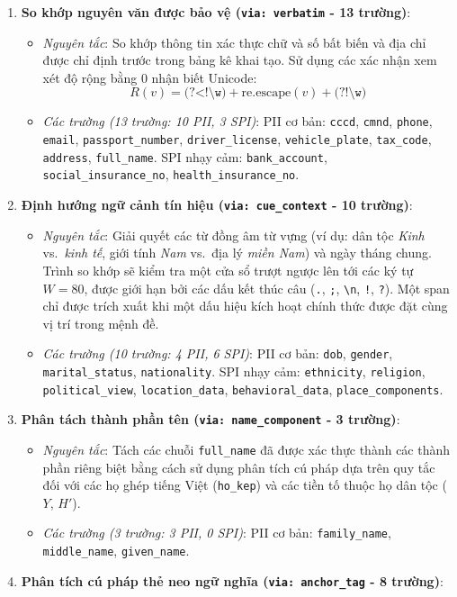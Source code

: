 \documentclass[
  11pt,
  a4paper,
]{article}
\providecommand{\tightlist}{%
  \setlength{\itemsep}{0pt}\setlength{\parskip}{0pt}}
\begin{document}
\begin{enumerate}
\def\labelenumi{\arabic{enumi}.}
\tightlist
\item
  \textbf{So khớp nguyên văn được bảo vệ (\texttt{via:\ verbatim} - 13
  trường)}:

  \begin{itemize}
  \tightlist
  \item
    \emph{Nguyên tắc}: So khớp thông tin xác thực chữ và số bất biến và
    địa chỉ được chỉ định trước trong bảng kê khai tạo. Sử dụng các xác
    nhận xem xét độ rộng bằng 0 nhận biết Unicode:
    \[R(v) = \texttt{(?<!\textbackslash{}w)} + \text{re.escape}(v) + \texttt{(?!\textbackslash{}w)}\]
  \item
    \emph{Các trường (13 trường: 10 PII, 3 SPI)}: PII cơ bản:
    \texttt{cccd}, \texttt{cmnd}, \texttt{phone}, \texttt{email},
    \texttt{passport\_number}, \texttt{driver\_license},
    \texttt{vehicle\_plate}, \texttt{tax\_code}, \texttt{address},
    \texttt{full\_name}. SPI nhạy cảm: \texttt{bank\_account},
    \texttt{social\_insurance\_no}, \texttt{health\_insurance\_no}.
  \end{itemize}
\item
  \textbf{Định hướng ngữ cảnh tín hiệu (\texttt{via:\ cue\_context} - 10
  trường)}:

  \begin{itemize}
  \tightlist
  \item
    \emph{Nguyên tắc}: Giải quyết các từ đồng âm từ vựng (ví dụ: dân tộc
    \emph{Kinh} vs.~\emph{kinh tế}, giới tính \emph{Nam} vs.~địa lý
    \emph{miền Nam}) và ngày tháng chung. Trình so khớp sẽ kiểm tra một
    cửa sổ trượt ngược lên tới các ký tự \(W = 80\), được giới hạn bởi
    các dấu kết thúc câu (\texttt{.}, \texttt{;},
    \texttt{\textbackslash{}n}, \texttt{!}, \texttt{?}). Một span chỉ
    được trích xuất khi một dấu hiệu kích hoạt chính thức được đặt cùng
    vị trí trong mệnh đề.
  \item
    \emph{Các trường (10 trường: 4 PII, 6 SPI)}: PII cơ bản:
    \texttt{dob}, \texttt{gender}, \texttt{marital\_status},
    \texttt{nationality}. SPI nhạy cảm: \texttt{ethnicity},
    \texttt{religion}, \texttt{political\_view},
    \texttt{location\_data}, \texttt{behavioral\_data},
    \texttt{place\_components}.
  \end{itemize}
\item
  \textbf{Phân tách thành phần tên (\texttt{via:\ name\_component} - 3
  trường)}:

  \begin{itemize}
  \tightlist
  \item
    \emph{Nguyên tắc}: Tách các chuỗi \texttt{full\_name} đã được xác
    thực thành các thành phần riêng biệt bằng cách sử dụng phân tích cú
    pháp dựa trên quy tắc đối với các họ ghép tiếng Việt
    (\texttt{ho\_kep}) và các tiền tố thuộc họ dân tộc (\(Y\), \(H'\)).
  \item
    \emph{Các trường (3 trường: 3 PII, 0 SPI)}: PII cơ bản:
    \texttt{family\_name}, \texttt{middle\_name}, \texttt{given\_name}.
  \end{itemize}
\item
  \textbf{Phân tích cú pháp thẻ neo ngữ nghĩa
  (\texttt{via:\ anchor\_tag} - 8 trường)}:


\end{enumerate}
\end{document}
